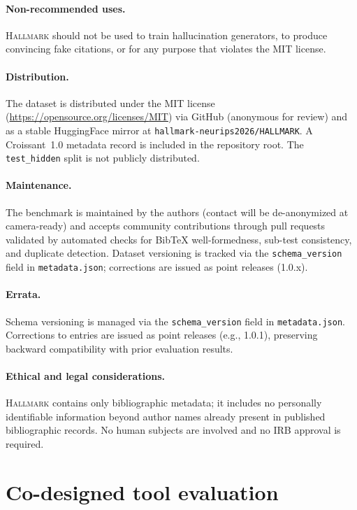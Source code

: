 \paragraph{Non-recommended uses.}
\textsc{Hallmark} should not be used to train hallucination generators, to produce convincing fake citations, or for any purpose that violates the MIT license.

\paragraph{Distribution.}
The dataset is distributed under the MIT license (\url{https://opensource.org/licenses/MIT}) via GitHub (anonymous for review) and as a stable HuggingFace mirror at \texttt{hallmark-neurips2026/HALLMARK}.
A Croissant~1.0 metadata record is included in the repository root.
The \texttt{test\_hidden} split is not publicly distributed.

\paragraph{Maintenance.}
The benchmark is maintained by the authors (contact will be de-anonymized at camera-ready) and accepts community contributions through pull requests validated by automated checks for BibTeX well-formedness, sub-test consistency, and duplicate detection.
Dataset versioning is tracked via the \texttt{schema\_version} field in \texttt{metadata.json}; corrections are issued as point releases (1.0.x).

\paragraph{Errata.}
Schema versioning is managed via the \texttt{schema\_version} field in \texttt{metadata.json}.
Corrections to entries are issued as point releases (e.g., 1.0.1), preserving backward compatibility with prior evaluation results.

\paragraph{Ethical and legal considerations.}
\textsc{Hallmark} contains only bibliographic metadata; it includes no personally identifiable information beyond author names already present in published bibliographic records.
No human subjects are involved and no IRB approval is required.

\section{Co-designed tool evaluation}
\label{app:codesign}

